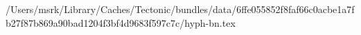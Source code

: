 /Users/msrk/Library/Caches/Tectonic/bundles/data/6ffe055852f8faf66c0acbe1a7fb27f87b869a90bad1204f3bf4d9683f597c7c/hyph-bn.tex